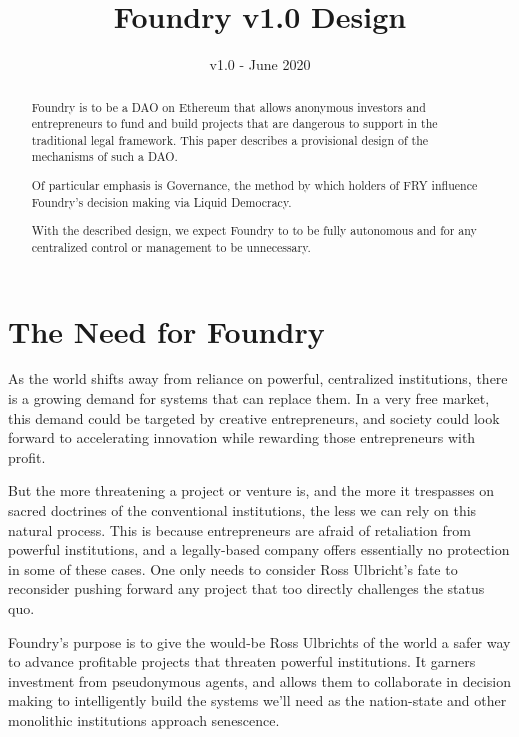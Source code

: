 \documentclass{article}
\title{Foundry v1.0 Design}
\date{v1.0 - June 2020}
\begin{document}

\maketitle
\begin{abstract}
	\setlength{\parskip}{1em}
	Foundry is to be a DAO on Ethereum that allows anonymous investors and entrepreneurs to fund and build projects that are dangerous to support in the traditional legal framework. This paper describes a provisional design of the mechanisms of such a DAO.
	
	Of particular emphasis is Governance, the method by which holders of FRY influence Foundry's decision making via Liquid Democracy.
	
	With the described design, we expect Foundry to to be fully autonomous and for any centralized control or management to be unnecessary.
\end{abstract}

\newpage
{}
\tableofcontents

\setlength{\parskip}{0.5em}

\newpage
{}
\section{The Need for Foundry} \label{need}

As the world shifts away from reliance on powerful, centralized institutions, there is a growing demand for systems that can replace them. In a very free market, this demand could be targeted by creative entrepreneurs, and society could look forward to accelerating innovation while rewarding those entrepreneurs with profit.

But the more threatening a project or venture is, and the more it trespasses on sacred doctrines of the conventional institutions, the less we can rely on this natural process. This is because entrepreneurs are afraid of retaliation from powerful institutions, and a legally-based company offers essentially no protection in some of these cases. One only needs to consider Ross Ulbricht's fate to reconsider pushing forward any project that too directly challenges the status quo.

Foundry's purpose is to give the would-be Ross Ulbrichts of the world a safer way to advance profitable projects that threaten powerful institutions. It garners investment from pseudonymous agents, and allows them to collaborate in decision making to intelligently build the systems we'll need as the nation-state and other monolithic institutions approach senescence.
\end{document}
